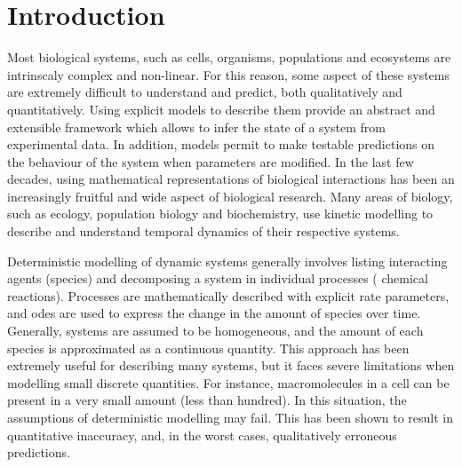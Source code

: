 \section{Introduction} \label{intro}

Most biological systems, such as cells, organisms, populations and ecosystems are intrinscaly complex and non-linear.
For this reason, some aspect of these systems are extremely difficult to understand and predict, both qualitatively and quantitatively\cite{klipp_systems_2013}.
Using explicit models to describe them provide an abstract and extensible framework which allows to infer the state of a system from experimental data.
In addition, models permit to make testable predictions on the behaviour of the system when parameters are modified.
In the last few decades, using mathematical representations of biological interactions has been an increasingly fruitful and wide aspect of biological research.
Many areas of biology, such as ecology, population biology and biochemistry,
use kinetic modelling to describe and understand temporal dynamics of their respective systems.

Deterministic modelling of dynamic systems generally involves listing
interacting agents (species) and decomposing a system in individual processes (\eg{} chemical reactions).
Processes are mathematically described with explicit rate parameters, and \glspl{ode} are used to express the change in the amount of species over time.
Generally, systems are assumed to be homogeneous, and the amount of each species is approximated as a continuous quantity.
This approach has been extremely useful for describing many systems, but it faces severe limitations when modelling small discrete quantities.
For instance, macromolecules in a cell can be present in a very small amount (less than hundred)\cite{ghaemmaghami_global_2003}.
In this situation, the assumptions of deterministic modelling may fail.
This has been shown to result in quantitative inaccuracy\cite{ale_general_2013}, and, in the worst cases, qualitatively erroneous predictions.


